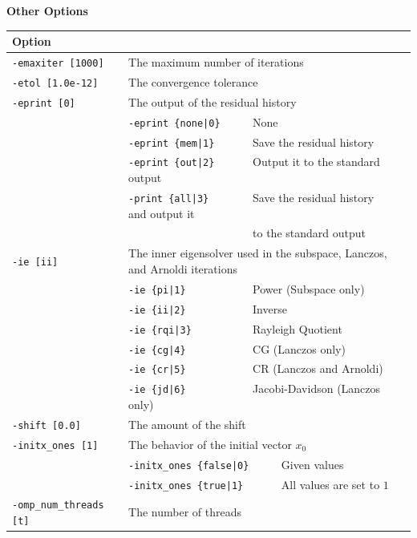 \documentclass[a4paper]{article}
\begin{document}
\begin{minipage}[t]{\textwidth}
\begin{center}
{\bf Other Options}\\
\begin{tabular}{l|ll}\hline\hline
Option &                          \\ \hline
\verb=-emaxiter [1000]= & The maximum number of iterations         \\ 
\verb=-etol [1.0e-12]=  & The convergence tolerance                \\
\verb=-eprint [0]=      & The output of the residual history                \\
                       & \verb=-eprint {none|0}     =  None \\
                       & \verb=-eprint {mem|1}      =  Save the residual history\\
                       & \verb=-eprint {out|2}      =  Output it to the standard output\\
                       & \verb=-print {all|3}       =  Save the residual history and output it \\
                       & \verb=                     =  to the standard output \\
\verb=-ie [ii]= & The inner eigensolver used in the subspace, Lanczos, and Arnoldi iterations\\
                       & \verb=-ie {pi|1}           =  Power (Subspace only)\\
                       & \verb=-ie {ii|2}           =  Inverse \\
                       & \verb=-ie {rqi|3}          =  Rayleigh Quotient \\
                       & \verb=-ie {cg|4}           =  CG (Lanczos only) \\
                       & \verb=-ie {cr|5}           =  CR (Lanczos and Arnoldi) \\
                       & \verb=-ie {jd|6}           =  Jacobi-Davidson (Lanczos only) \\
\verb=-shift [0.0]= & The amount of the shift  \\
\verb=-initx_ones [1]= & The behavior of the initial vector $x_{0}$  \\
                       & \verb=-initx_ones {false|0}     =  Given values \\
                       & \verb=-initx_ones {true|1}      =  All values are set to $1$ \\
\verb=-omp_num_threads [t]= & The number of threads        \\ 

\end{tabular}
\end{center}
\end{minipage}
\end{document}
